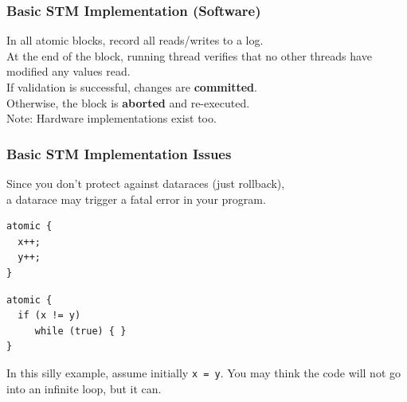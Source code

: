 \begin{frame}
  \frametitle{Basic STM Implementation (Software)}


    In all atomic blocks, record all reads/writes to a log.\\[1em]
    At the end of the block, running thread verifies that no other threads
      have modified any values read.\\[1em]
    If validation is successful, changes are {\bf committed}.\\
    Otherwise, the block is {\bf aborted} and re-executed.\\[2em]

  Note: Hardware implementations exist too.



\end{frame}

\begin{frame}[fragile]
  \frametitle{Basic STM Implementation Issues}


    Since you don't protect against dataraces (just rollback),\\
      a datarace may trigger a fatal error in your program.

  \begin{lstlisting}
atomic {
  x++;
  y++;
}
  \end{lstlisting}

  \begin{lstlisting}
atomic {
  if (x != y)
     while (true) { }
}
  \end{lstlisting}

 In this silly example, assume initially {\tt x = y}. You may think the
      code will not go into an infinite loop, but it can.

\end{frame}

